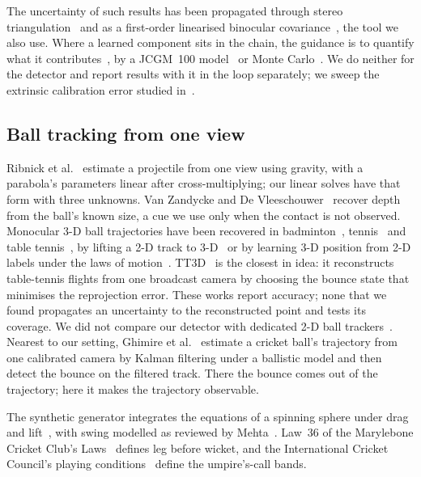 \documentclass[journal]{IEEEtran}
\begin{document}
The uncertainty of such results has been propagated through stereo
triangulation~\cite{dileo2011covariance,ezebili2024uncertainty} and as a first-order linearised binocular
covariance~\cite{he2026binocular}, the tool we also use. Where a learned component sits in the chain, the
guidance is to quantify what it contributes~\cite{alosman2021mluq,buchicchio2025uq}, by a JCGM~100
model~\cite{angrisani2025mlgum} or Monte Carlo~\cite{angrisani2026mlmodel}. We do neither for the detector
and report results with it in the loop separately; we sweep the extrinsic calibration error studied
in~\cite{wang2024extrinsicerror}.

\subsection{Ball tracking from one view}

Ribnick et al.~\cite{ribnick2009projectiles} estimate a projectile from one view using gravity, with a
parabola's parameters linear after cross-multiplying; our linear solves have that form with three unknowns. Van
Zandycke and De Vleeschouwer~\cite{vanzandycke2022ball3d} recover depth from the ball's known size, a cue we
use only when the contact is not observed. Monocular 3-D ball trajectories
have been recovered in badminton~\cite{liu2022monotrack}, tennis~\cite{ertner2024synthnet} and table tennis~\cite{kienzle2025spin}, by lifting
a 2-D track to 3-D~\cite{ponglertnapakorn2025ball} or by learning 3-D position from 2-D labels under the
laws of motion~\cite{kienzle2024physics}. TT3D~\cite{gossard2025tt3d} is the closest in idea: it
reconstructs table-tennis flights from one broadcast camera by choosing the bounce state that minimises the
reprojection error. These works report accuracy; none that we found propagates an uncertainty to the
reconstructed point and tests its coverage. We did not compare our detector with dedicated 2-D ball trackers~\cite{tarashima2023wasb,raj2025tracknetv4}. Nearest to
our setting, Ghimire et al.~\cite{ghimire2026cricket} estimate a cricket ball's trajectory from one calibrated
camera by Kalman filtering under a ballistic model and then detect the bounce on the filtered track. There
the bounce comes out of the trajectory; here it makes the trajectory observable.

The synthetic generator integrates the equations of a spinning sphere under drag and
lift~\cite{robinson2013projectile}, with swing modelled as reviewed by Mehta~\cite{mehta2005swing}. Law~36 of the Marylebone Cricket Club's Laws~\cite{mcc2017laws} defines leg before wicket, and the International Cricket Council's playing
conditions~\cite{icc2023drs} define the umpire's-call bands.
\end{document}
